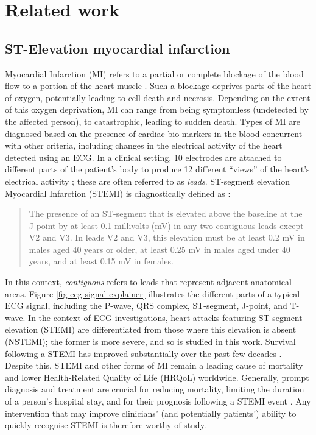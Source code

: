 \documentclass[
  10pt,
  letterpaper,
]{article}
\begin{document}
\section{Related work}\label{sec-related-work}

\subsection{ST-Elevation myocardial infarction}\label{sec-stemi}

Myocardial Infarction (MI) refers to a partial or complete blockage of
the blood flow to a portion of the heart muscle \citep{ojha_2023}. Such
a blockage deprives parts of the heart of oxygen, potentially leading to
cell death and necrosis. Depending on the extent of this oxygen
deprivation, MI can range from being symptomless (undetected by the
affected person), to catastrophic, leading to sudden death. Types of MI
are diagnosed based on the presence of cardiac bio-markers in the blood
concurrent with other criteria, including changes in the electrical
activity of the heart \citep{thygesen_2019} detected using an ECG. In a
clinical setting, 10 electrodes are attached to different parts of the
patient's body to produce 12 different ``views'' of the heart's
electrical activity \citep{hampton_2024}; these are often referred to as
\emph{leads}. ST-segment elevation Myocardial Infarction (STEMI) is
diagnostically defined as \citep{rao_2025, akbar_2024}:

\begin{quotation}
  The presence of an ST-segment that is elevated above the baseline at the 
  J-point by at least 0.1 millivolts (mV) in any two contiguous leads except V2 and V3.
  In leads V2 and V3, this elevation must be at least 0.2 mV in males aged 40 years or older,
  at least 0.25 mV in males aged under 40 years, and at least 0.15 mV in females.
\end{quotation}

In this context, \emph{contiguous} refers to leads that represent
adjacent anatomical areas. Figure \ref{fig-ecg-signal-explainer}
illustrates the different parts of a typical ECG signal, including the
P-wave, QRS complex, ST-segment, J-point, and T-wave. In the context of
ECG investigations, heart attacks featuring ST-segment elevation (STEMI)
are differentiated from those where this elevation is absent (NSTEMI);
the former is more severe, and so is studied in this work. Survival
following a STEMI has improved substantially over the past few decades
\citep{pascual_2020, pedersen_2014, gale_2014}. Despite this, STEMI and
other forms of MI remain a leading cause of mortality
\citep{moraes_2017, ibanez_2018} and lower Health-Related Quality of
Life (HRQoL) \citep{wang_2014, kang_2016, bahall_2018} worldwide.
Generally, prompt diagnosis and treatment are crucial for reducing
mortality, limiting the duration of a person's hospital stay, and for
their prognosis following a STEMI event \citep{ibanez_2018}. Any
intervention that may improve clinicians' (and potentially patients')
ability to quickly recognise STEMI is therefore worthy of study.
\end{document}

